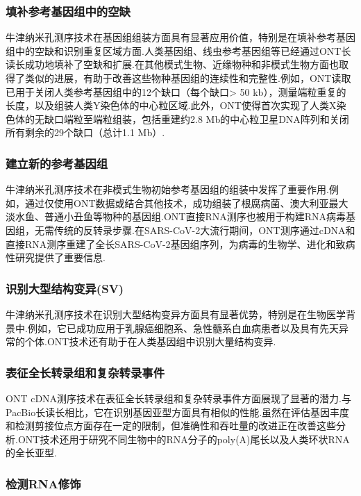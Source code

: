 \subsubsection{填补参考基因组中的空缺}

牛津纳米孔测序技术在基因组组装方面具有显著应用价值，特别是在填补参考基因组中的空缺和识别重复区域方面.人类基因组、线虫参考基因组等已经通过ONT长读长成功地填补了空缺和扩展.在其他模式生物、近缘物种和非模式生物方面也取得了类似的进展，有助于改善这些物种基因组的连续性和完整性.例如，ONT读取已用于关闭人类参考基因组中的12个缺口（每个缺口> 50 kb），测量端粒重复的长度，以及组装人类Y染色体的中心粒区域\cite{jain2018linear}.此外，ONT使得首次实现了人类X染色体的无缺口端粒至端粒组装，包括重建约2.8 Mb的中心粒卫星DNA阵列和关闭所有剩余的29个缺口（总计1.1 Mb）\cite{miga2020telomere}.

\subsubsection{建立新的参考基因组}

牛津纳米孔测序技术在非模式生物初始参考基因组的组装中发挥了重要作用.例如，通过仅使用ONT数据或结合其他技术，成功组装了根腐病菌、澳大利亚最大淡水鱼、普通小丑鱼等物种的基因组.ONT直接RNA测序也被用于构建RNA病毒基因组，无需传统的反转录步骤.在SARS-CoV-2大流行期间，ONT测序通过cDNA和直接RNA测序重建了全长SARS-CoV-2基因组序列，为病毒的生物学、进化和致病性研究提供了重要信息.

\subsubsection{识别大型结构变异(SV)}

牛津纳米孔测序技术在识别大型结构变异方面具有显著优势，特别是在生物医学背景中.例如，它已成功应用于乳腺癌细胞系、急性髓系白血病患者以及具有先天异常的个体.ONT技术还有助于在人类基因组中识别大量结构变异.

\subsubsection{表征全长转录组和复杂转录事件}

ONT cDNA测序技术在表征全长转录组和复杂转录事件方面展现了显著的潜力.与PacBio长读长相比，它在识别基因亚型方面具有相似的性能.虽然在评估基因丰度和检测剪接位点方面存在一定的限制，但准确性和吞吐量的改进正在改善这些分析.ONT技术还用于研究不同生物中的RNA分子的poly(A)尾长以及人类环状RNA的全长亚型.

\subsubsection{检测RNA修饰}

